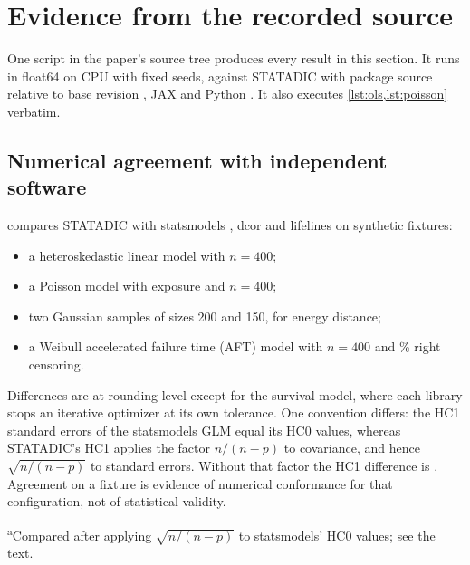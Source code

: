 \section{Evidence from the recorded source}\label{sec:evidence}

One script in the paper's source tree produces every result in this section.
It runs in float64 on CPU with fixed seeds, against STATADIC
 with package source 
relative to base revision \texttt{}, JAX
 and
Python . It also executes \cref{lst:ols,lst:poisson}
verbatim.

\subsection{Numerical agreement with independent software}\label{sec:agreement}

 compares STATADIC with statsmodels
, dcor  and lifelines
 on synthetic fixtures:
\begin{itemize}
  \item a heteroskedastic linear model with $n = 400$;
  \item a Poisson model with exposure and $n = 400$;
  \item two Gaussian samples of sizes 200 and 150, for energy distance;
  \item a Weibull accelerated failure time (AFT) model with $n = 400$ and
    \% right censoring.
\end{itemize}

Differences are at rounding level except for the survival model, where each
library stops an iterative optimizer at its own tolerance. One convention
differs: the HC1 standard errors of the statsmodels GLM equal its HC0 values,
whereas STATADIC's HC1 applies the factor $n/(n-p)$ to covariance, and hence
$\sqrt{n/(n-p)}$ to standard errors. Without that factor the HC1 difference is
. Agreement on a fixture is
evidence of numerical conformance for that configuration, not of statistical
validity.

\begin{table}[t]
  \centering
  \small
  \caption{Maximum absolute differences between STATADIC and independent software
  in float64.}
  \label{tab:agreement}
  \setlength{\tabcolsep}{4pt}
  

  \smallskip
  \footnotesize\textsuperscript{a}Compared after applying $\sqrt{n/(n-p)}$ to
  statsmodels' HC0 values; see the text.
\end{table}

